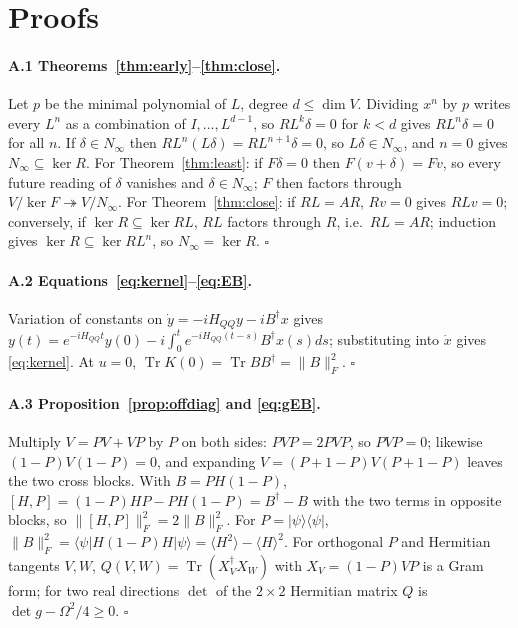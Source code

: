 \documentclass[11pt]{article}
\theoremstyle{definition}
\newcommand{\Tr}{\operatorname{Tr}}
\newcommand{\F}[1]{\lVert #1\rVert_F}
\begin{document}
\appendix
\sloppy
\section{Proofs}

\paragraph{A.1 Theorems~\ref{thm:early}--\ref{thm:close}.} Let $p$ be the minimal polynomial of $L$, degree $d\le\dim V$. Dividing $x^n$ by $p$ writes every $L^n$ as a combination of $I,\dots,L^{d-1}$, so $RL^k\delta=0$ for $k<d$ gives $RL^n\delta=0$ for all $n$. If $\delta\in N_\infty$ then $RL^n(L\delta)=RL^{n+1}\delta=0$, so $L\delta\in N_\infty$, and $n=0$ gives $N_\infty\subseteq\ker R$. For Theorem~\ref{thm:least}: if $F\delta=0$ then $F(v+\delta)=Fv$, so every future reading of $\delta$ vanishes and $\delta\in N_\infty$; $F$ then factors through $V/\ker F\twoheadrightarrow V/N_\infty$. For Theorem~\ref{thm:close}: if $RL=AR$, $Rv=0$ gives $RLv=0$; conversely, if $\ker R\subseteq\ker RL$, $RL$ factors through $R$, i.e.\ $RL=AR$; induction gives $\ker R\subseteq\ker RL^n$, so $N_\infty=\ker R$. $\square$

\paragraph{A.2 Equations~\eqref{eq:kernel}--\eqref{eq:EB}.} Variation of constants on $\dot y=-iH_{QQ}y-iB^\dagger x$ gives $y(t)=e^{-iH_{QQ}t}y(0)-i\int_0^te^{-iH_{QQ}(t-s)}B^\dagger x(s)ds$; substituting into $\dot x$ gives \eqref{eq:kernel}. At $u=0$, $\Tr K(0)=\Tr BB^\dagger=\F{B}^2$. $\square$

\paragraph{A.3 Proposition~\ref{prop:offdiag} and \eqref{eq:gEB}.} Multiply $V=PV+VP$ by $P$ on both sides: $PVP=2PVP$, so $PVP=0$; likewise $(1-P)V(1-P)=0$, and expanding $V=(P+1-P)V(P+1-P)$ leaves the two cross blocks. With $B=PH(1-P)$, $[H,P]=(1-P)HP-PH(1-P)=B^\dagger-B$ with the two terms in opposite blocks, so $\F{[H,P]}^2=2\F{B}^2$. For $P=|\psi\rangle\langle\psi|$, $\F{B}^2=\langle\psi|H(1-P)H|\psi\rangle=\langle H^2\rangle-\langle H\rangle^2$. For orthogonal $P$ and Hermitian tangents $V,W$, $Q(V,W)=\Tr(X_V^\dagger X_W)$ with $X_V=(1-P)VP$ is a Gram form; for two real directions $\det$ of the $2\times2$ Hermitian matrix $Q$ is $\det g-\Omega^2/4\ge0$. $\square$
\end{document}
